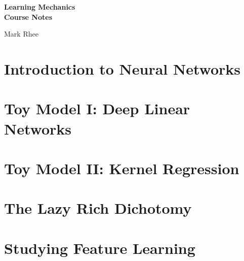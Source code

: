\documentclass[11pt, oneside]{book}
\begin{document}

\begin{titlepage}
\raggedright
 
\vspace*{2cm}
{\fontsize{32}{40}\selectfont\bfseries Learning Mechanics}\\[0.6em]
{\fontsize{20}{28}\selectfont\bfseries Course Notes}
 
\vspace{2.5cm}
 
{\large Mark Rhee}
 
\vfill
 
\restoregeometry
\end{titlepage}

\chapter{Introduction to Neural Networks}


\clearpage

\chapter{Toy Model I: Deep Linear Networks}


\clearpage

\chapter{Toy Model II: Kernel Regression}


\clearpage

\chapter{The Lazy Rich Dichotomy}
% 
\clearpage

\chapter{Studying Feature Learning}

\clearpage
\end{document}
